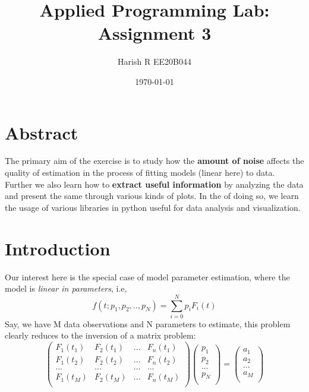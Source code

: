 \documentclass[11pt, a4paper]{article}
\title{Applied Programming Lab: Assignment 3} %
\author{Harish R EE20B044} %
\date{\today} %
\begin{document}
    \maketitle %
    \tableofcontents
    \clearpage
    

    \section{Abstract}
        The primary aim of the exercise is to study how the \textbf{amount of noise} affects the quality of estimation in the process of fitting models (linear here) to data. Further we also learn how to \textbf{extract useful information} by analyzing the data and present the same through various kinds of plots. In the  of doing so, we learn the usage of various libraries in python useful for data analysis and visualization.
    \section{Introduction}
        Our interest here is the special case of model parameter estimation, where the model is \emph{linear in parameters}, i.e,
        \begin{equation}
            f(t;p_1, p_2,..,p_N) = \sum_{i=0}^{N}p_iF_i(t)
        \end{equation}
        Say, we have M data observations and N parameters to estimate, this problem clearly reduces to the inversion of a matrix problem:
        \begin{equation}
            \left(\begin{matrix}
            F_1(t_1) & F_2(t_1) & ... & F_n(t_1)\\
            F_1(t_2) & F_2(t_2) & ... & F_n(t_2)\\
            ... & ... & ... & ...\\
            F_1(t_M) & F_2(t_M) & ... & F_n(t_M)\\
            \end{matrix}\right)
            \left(\begin{matrix}
            p_1\\
            p_2\\
            ...\\
            p_N\\
            \end{matrix}\right)
            =
            \left(\begin{matrix}
            a_1\\
            a_2\\
            ...\\
            a_M\\
            \end{matrix}\right)
            \label{eq0}
        \end{equation}
\end{document}
